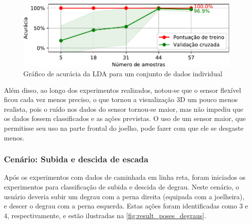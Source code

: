 \begin{figure}[ht]
	\caption{\label{fig:result_accuracy_lda}Gráfico de acurácia da LDA para um conjunto de dados individual}
	\begin{center}
	    \includegraphics[width=\textwidth]{resources/result_accuracy_lda}
	\end{center}
\end{figure}

Além disso, ao longo dos experimentos realizados, notou-se que o sensor flexível ficou cada vez menos preciso, o que tornou a visualização $3$D um pouco menos realista, pois o ruído nos dados do sensor tornou-se maior, mas não impediu que os dados fossem classificados e as ações previstas. O uso de um sensor maior, que permitisse seu uso na parte frontal do joelho, pode fazer com que ele se desgaste menos.

\subsubsection{Cenário: Subida e descida de escada}

Após os experimentos com dados de caminhada em linha reta, foram iniciados os experimentos para classificação de subida e descida de degrau. Neste cenário, o usuário deveria subir um degrau com a perna direita (equipada com a joelheira), e descer o degrau com a perna esquerda. Estas ações foram identificadas como \(3\) e \(4\), respectivamente, e estão ilustradas na \autoref{fig:result_poses_degraus}.

